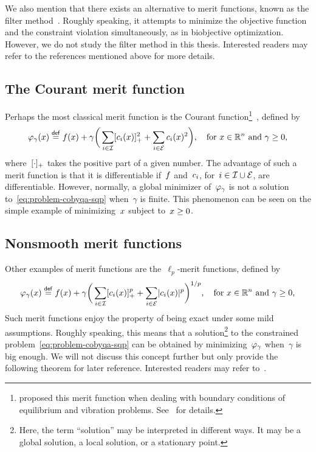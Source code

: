 We also mention that there exists an alternative to merit functions, known as the filter method~\cite{Fletcher_Leyffer_2002,Fletcher_Leyffer_Toint_1998,Fletcher_Leyffer_Toint_2002,Fletcher_Leyffer_Toint_2006,Riberio_Karas_Gonzaga_2008}.
Roughly speaking, it attempts to minimize the objective function and the constraint violation simultaneously, as in biobjective optimization.
However, we do not study the filter method in this thesis.
Interested readers may refer to the references mentioned above for more details.

\subsection{The Courant merit function}

Perhaps the most classical merit function is the Courant function\footnote{\citeauthor{Courant_1943} proposed this merit function when dealing with boundary conditions of equilibrium and vibration problems. See~\cite[Pt.~II, \S~3]{Courant_1943} for details.}~\cite{Courant_1943}, defined by
\begin{equation*}
    \merit_{\gamma}(\iter) \eqdef \obj(\iter) + \gamma \bigg( \sum_{i \in \iub} \posp{\con{i}(\iter)}^2 + \sum_{i \in \ieq} \con{i}(\iter)^2 \bigg), \quad \text{for~$x \in \R^n$ and~$\gamma \ge 0$,}
\end{equation*}
%
where~$[\cdot]_+$ takes the positive part of a given number.
The advantage of such a merit function is that it is differentiable if~$f$ and~$c_{i}$, for~$i \in \mathcal{I} \cup \mathcal{E}$, are differentiable.
However, normally, a global minimizer of~$\merit_{\gamma}$ is not a solution to~\cref{eq:problem-cobyqa-sqp} when~$\gamma$ is finite.
This phenomenon can be seen on the simple example of minimizing~$\iter$ subject to~$\iter \ge 0$.

\subsection{Nonsmooth merit functions}

Other examples of merit functions are the~$\ell_p$-merit functions, defined by
\begin{equation*}
    \merit_{\gamma}(\iter) \eqdef \obj(\iter) + \gamma \bigg( \sum_{i \in \iub} \posp{\con{i}(\iter)}^p + \sum_{i \in \ieq} \abs{\con{i}(\iter)}^p \bigg)^{1/p}, \quad \text{for~$\iter \in \R^n$ and~$\gamma \ge 0$,}
\end{equation*}
Such merit functions enjoy the property of being exact under some mild assumptions.
Roughly speaking, this means that a solution\footnote{Here, the term \enquote{solution} may be interpreted in different ways. It may be a global solution, a local solution, or a stationary point.} to the constrained problem~\cref{eq:problem-cobyqa-sqp} can be obtained by minimizing~$\merit_{\gamma}$ when~$\gamma$ is big enough.
We will not discuss this concept further but only provide the following theorem for later reference.
Interested readers may refer to~\cite{Han_Mangasarian_1979,Mayne_1980,Pillo_Grippo_1989}.

